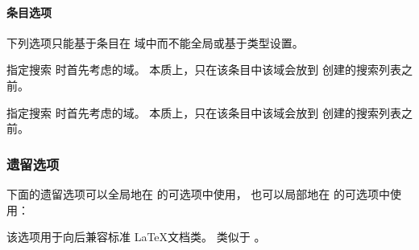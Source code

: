 \paragraph{条目选项}%
\label{use:opt:bib:entry}

下列选项只能基于条目在  域中而不能全局或基于类型设置。

\begin{optionlist}


指定搜索  时首先考虑的域。
本质上，只在该条目中该域会放到  创建的搜索列表之前。


指定搜索  时首先考虑的域。
本质上，只在该条目中该域会放到  创建的搜索列表之前。

\end{optionlist}

\subsubsection{遗留选项}%

下面的遗留选项可以全局地在  的可选项中使用，
也可以局部地在  的可选项中使用：

\begin{optionlist}
	
\DeprecatedMark  %
该选项用于向后兼容标准 \LaTeX 文档类。
 类似于 。

\end{optionlist}


